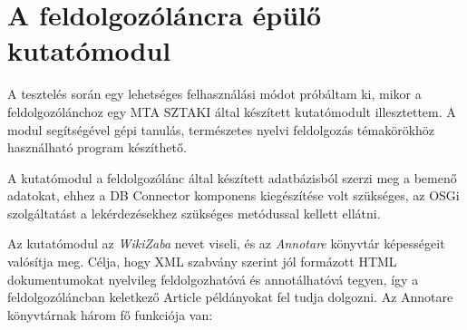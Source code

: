 
\section{A feldolgozóláncra épülő kutatómodul}
\label{sec:researchbundle}

A tesztelés során egy lehetséges felhasználási módot próbáltam ki, mikor a feldolgozólánchoz egy MTA SZTAKI által készített kutatómodult illesztettem. A modul segítségével gépi tanulás, természetes nyelvi feldolgozás témakörökhöz használható program készíthető.

A kutatómodul a feldolgozólánc által készített adatbázisból szerzi meg a bemenő adatokat, ehhez a DB Connector komponens kiegészítése volt szükséges, az OSGi szolgáltatást a lekérdezésekhez szükséges metódussal kellett ellátni.

Az kutatómodul az \textit{WikiZaba} nevet viseli, és az \textit{Annotare} könyvtár képességeit valósítja meg. Célja, hogy XML szabvány szerint jól formázott HTML dokumentumokat nyelvileg feldolgozhatóvá és annotálhatóvá tegyen, így a feldolgozóláncban keletkező Article példányokat fel tudja dolgozni. Az Annotare könyvtárnak három fő funkciója van:

